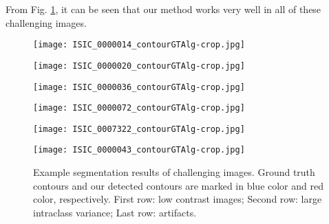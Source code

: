 \documentclass{article}
\begin{document}
From Fig. \ref{fig:qualitative}, it can be seen that our method works very well 
in all of these challenging images.
\begin{figure}[htb]
\begin{minipage}[b]{.48\linewidth}
  \centering
  \centerline{\texttt{[image: ISIC\_0000014\_contourGTAlg-crop.jpg]}}
\end{minipage}
%
\begin{minipage}[b]{.48\linewidth}
  \centering
  \centerline{\texttt{[image: ISIC\_0000020\_contourGTAlg-crop.jpg]}}
\end{minipage}
\hfill
\begin{minipage}[b]{0.48\linewidth}
  \centering
  \centerline{\texttt{[image: ISIC\_0000036\_contourGTAlg-crop.jpg]}}
\end{minipage}
\begin{minipage}[b]{0.48\linewidth}
  \centering
  \centerline{\texttt{[image: ISIC\_0000072\_contourGTAlg-crop.jpg]}}
\end{minipage}
\begin{minipage}[b]{0.48\linewidth}
  \centering
  \centerline{\texttt{[image: ISIC\_0007322\_contourGTAlg-crop.jpg]}}
\end{minipage}
\hfill
\begin{minipage}[b]{0.48\linewidth}
  \centering
  \centerline{\texttt{[image: ISIC\_0000043\_contourGTAlg-crop.jpg]}}
\end{minipage}
%
\caption{Example segmentation results of challenging images. Ground truth contours and our detected contours are marked in blue color and red color, respectively. First row: low contrast images; Second row: large intraclass variance; Last row: artifacts.}
\label{fig:qualitative}
%
\end{figure}
\end{document}
